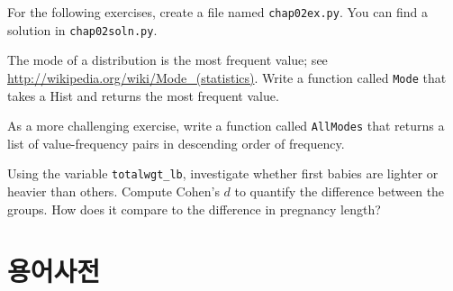 For the following exercises, create a file named {\tt chap02ex.py}.
You can find a solution in \verb"chap02soln.py".

\begin{exercise}
The mode of a distribution is the most frequent value; see
\url{http://wikipedia.org/wiki/Mode_(statistics)}.  Write a function
called {\tt Mode} that takes a Hist and returns the most
frequent value.

As a more challenging exercise, write a function called {\tt AllModes}
that returns a list of value-frequency pairs in descending order of
frequency.
\end{exercise}

\begin{exercise}
Using the variable \verb"totalwgt_lb", investigate whether first
babies are lighter or heavier than others.  Compute Cohen's $d$
to quantify the difference between the groups.  How does it
compare to the difference in pregnancy length?
\end{exercise}


\section{용어사전}

